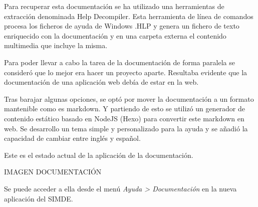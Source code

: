 \bigskip
Para recuperar esta documentación se ha utilizado una herramientas de extracción denominada
Help Decompiler. Esta herramienta de línea de comandos procesa los ficheros de ayuda de
Windows .HLP y genera un fichero de texto enriquecido con la documentación y en una carpeta
externa el contenido multimedia que incluye la misma.

\bigskip
Para poder llevar a cabo la tarea de la documentación de forma paralela se consideró que lo mejor era
hacer un proyecto aparte. Resultaba evidente que la documentación de una aplicación web debía de estar en la
web. 

\bigskip
Tras barajar algunas opciones, se optó por mover la documentación a un formato mantenible como 
es markdown. Y partiendo de esto se utilizó un generador de contenido estático basado en NodeJS (Hexo)
para convertir este markdown en web. Se desarrollo un tema simple y personalizado para la ayuda y se 
añadió la capacidad de cambiar entre inglés y español.

\bigskip
Este es el estado actual de la aplicación de la documentación.

    IMAGEN DOCUMENTACIÓN

\bigskip
Se puede acceder a ella desde el menú \textit{Ayuda > Documentación} en la nueva aplicación del SIMDE.
